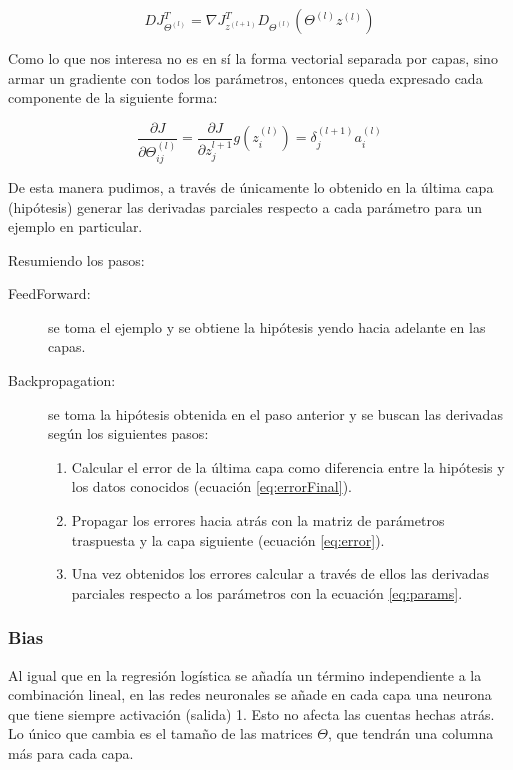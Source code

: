 \begin{equation}
D J_{\Theta^{(l)}}^T = \nabla J_{z^{(l+1)}}^T D_{\Theta^{(l)}} (\Theta^{(l)} z^{(l)})
\end{equation}

Como lo que nos interesa no es en sí la forma vectorial separada por capas, sino armar un gradiente con todos los parámetros, entonces queda expresado cada componente de la siguiente forma:

\begin{equation} \label{eq:params}
\frac{\partial J}{\partial \Theta_{ij}^{(l)}} = \frac{\partial J}{\partial z_j^{l+1}}g(z_i^{(l)}) = \delta_j^{(l+1)}a_i^{(l)}
\end{equation}

De esta manera pudimos, a través de únicamente lo obtenido en la última capa (hipótesis) generar las derivadas parciales respecto a cada parámetro para un ejemplo en particular.

Resumiendo los pasos:
\begin{description}
\item[FeedForward:] se toma el ejemplo y se obtiene la hipótesis yendo hacia adelante en las capas.
\item[Backpropagation:] se toma la hipótesis obtenida en el paso anterior y se buscan las derivadas según los siguientes pasos:
	\begin{enumerate}
	\item Calcular el error de la última capa como diferencia entre la hipótesis y los datos conocidos (ecuación \ref{eq:errorFinal}).
	\item Propagar los errores hacia atrás con la matriz de parámetros traspuesta y la capa siguiente (ecuación \ref{eq:error}).
	\item Una vez obtenidos los errores calcular a través de ellos las derivadas parciales respecto a los parámetros con la ecuación \ref{eq:params}.
	
	\end{enumerate}
\end{description}

\subsubsection{Bias} Al igual que en la regresión logística se añadía un término independiente a la combinación lineal, en las redes neuronales se añade en cada capa una neurona que tiene siempre activación (salida) 1. Esto no afecta las cuentas hechas atrás. Lo único que cambia es el tamaño de las matrices $\Theta$, que tendrán una columna más para cada capa.

